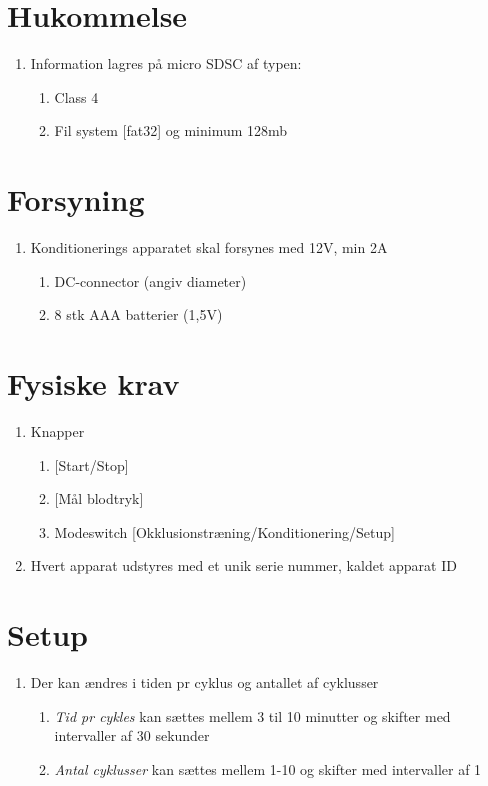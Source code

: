 	
	\section{Hukommelse}
	\begin{enumerate}
		\setlength\itemsep{0cm} %
		\item Information lagres på micro SDSC af typen:
		\begin{enumerate}
			\item Class 4
			\item Fil system [fat32] og minimum 128mb
		\end{enumerate}
	\end{enumerate}
	
	\section{Forsyning}
	\begin{enumerate}
		\setlength\itemsep{0cm} %
		\item Konditionerings apparatet skal forsynes med 12V, min 2A
		\begin{enumerate}
			\item DC-connector (angiv diameter) 
			\item 8 stk AAA batterier (1,5V)
		\end{enumerate}
	\end{enumerate}
	
	\section{Fysiske krav}
	\begin{enumerate}
		\setlength\itemsep{0cm} %
		\item Knapper
		\begin{enumerate}
			\item  {[}Start/Stop]
			\item {[}Mål blodtryk]
			\item Modeswitch [Okklusionstræning/Konditionering/Setup]
		\end{enumerate}
		\item Hvert apparat udstyres med et unik serie nummer, kaldet apparat ID
	\end{enumerate}
	
	\section{Setup}
	\begin{enumerate}
		\setlength\itemsep{0cm} %
		\item Der kan ændres i tiden pr cyklus og antallet af cyklusser
		\begin{enumerate}
			\item \textit{Tid pr cykles} kan sættes mellem 3 til 10 minutter og skifter med intervaller af 30 sekunder
			\item \textit{Antal cyklusser }kan sættes mellem 1-10 og skifter med intervaller af 1
		\end{enumerate}
	\end{enumerate}